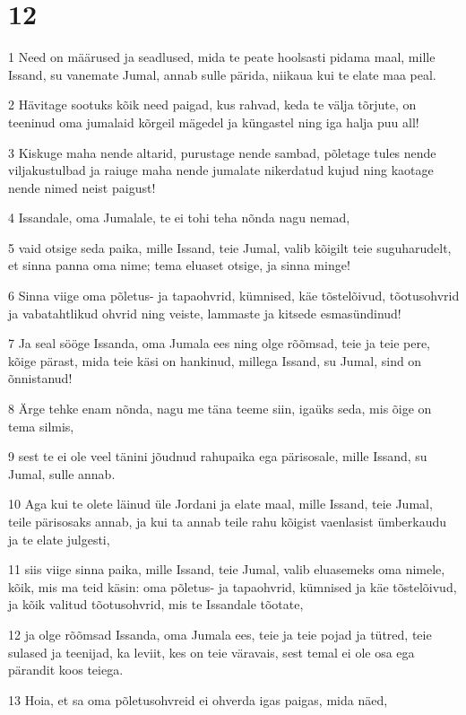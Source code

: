\chapter{12}

\par 1 Need on määrused ja seadlused, mida te peate hoolsasti pidama maal, mille Issand, su vanemate Jumal, annab sulle pärida, niikaua kui te elate maa peal.
\par 2 Hävitage sootuks kõik need paigad, kus rahvad, keda te välja tõrjute, on teeninud oma jumalaid kõrgeil mägedel ja küngastel ning iga halja puu all!
\par 3 Kiskuge maha nende altarid, purustage nende sambad, põletage tules nende viljakustulbad ja raiuge maha nende jumalate nikerdatud kujud ning kaotage nende nimed neist paigust!
\par 4 Issandale, oma Jumalale, te ei tohi teha nõnda nagu nemad,
\par 5 vaid otsige seda paika, mille Issand, teie Jumal, valib kõigilt teie suguharudelt, et sinna panna oma nime; tema eluaset otsige, ja sinna minge!
\par 6 Sinna viige oma põletus- ja tapaohvrid, kümnised, käe tõstelõivud, tõotusohvrid ja vabatahtlikud ohvrid ning veiste, lammaste ja kitsede esmasündinud!
\par 7 Ja seal sööge Issanda, oma Jumala ees ning olge rõõmsad, teie ja teie pere, kõige pärast, mida teie käsi on hankinud, millega Issand, su Jumal, sind on õnnistanud!
\par 8 Ärge tehke enam nõnda, nagu me täna teeme siin, igaüks seda, mis õige on tema silmis,
\par 9 sest te ei ole veel tänini jõudnud rahupaika ega pärisosale, mille Issand, su Jumal, sulle annab.
\par 10 Aga kui te olete läinud üle Jordani ja elate maal, mille Issand, teie Jumal, teile pärisosaks annab, ja kui ta annab teile rahu kõigist vaenlasist ümberkaudu ja te elate julgesti,
\par 11 siis viige sinna paika, mille Issand, teie Jumal, valib eluasemeks oma nimele, kõik, mis ma teid käsin: oma põletus- ja tapaohvrid, kümnised ja käe tõstelõivud, ja kõik valitud tõotusohvrid, mis te Issandale tõotate,
\par 12 ja olge rõõmsad Issanda, oma Jumala ees, teie ja teie pojad ja tütred, teie sulased ja teenijad, ka leviit, kes on teie väravais, sest temal ei ole osa ega pärandit koos teiega.
\par 13 Hoia, et sa oma põletusohvreid ei ohverda igas paigas, mida näed,
